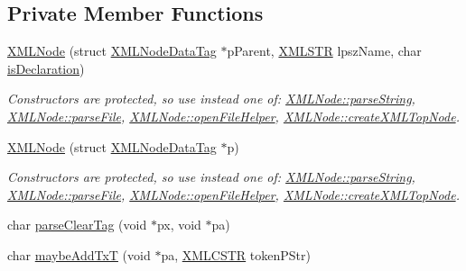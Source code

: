 \subsection*{Private Member Functions}
\begin{DoxyCompactItemize}
\item 
\hyperlink{structXMLNode_aa4a98957921a25716fd2936642d47967}{X\-M\-L\-Node} (struct \hyperlink{structXMLNode_1_1XMLNodeDataTag}{X\-M\-L\-Node\-Data\-Tag} $\ast$p\-Parent, \hyperlink{xmlParser_8h_a849d96105aa0c8f64b5c10d9151a3cdc}{X\-M\-L\-S\-T\-R} lpsz\-Name, char \hyperlink{group__navigate_ga71df27d54a2dc09b0a456406a7e8c6d3}{is\-Declaration})
\begin{DoxyCompactList}\small\item\em Constructors are protected, so use instead one of\-: \hyperlink{group__conversions_ga72125a4ccfae9b39bafab768346bbc7e}{X\-M\-L\-Node\-::parse\-String}, \hyperlink{group__conversions_gae984d7ebce97fad429b2b786439815fb}{X\-M\-L\-Node\-::parse\-File}, \hyperlink{group__conversions_ga46f99cf406604471e15d4378f74ecc63}{X\-M\-L\-Node\-::open\-File\-Helper}, \hyperlink{group__creation_ga1e2d0403450db891eedc76b6bfdba452}{X\-M\-L\-Node\-::create\-X\-M\-L\-Top\-Node}. \end{DoxyCompactList}\item 
\hyperlink{structXMLNode_a459bf6af13ca13472db5991050abd9dc}{X\-M\-L\-Node} (struct \hyperlink{structXMLNode_1_1XMLNodeDataTag}{X\-M\-L\-Node\-Data\-Tag} $\ast$p)
\begin{DoxyCompactList}\small\item\em Constructors are protected, so use instead one of\-: \hyperlink{group__conversions_ga72125a4ccfae9b39bafab768346bbc7e}{X\-M\-L\-Node\-::parse\-String}, \hyperlink{group__conversions_gae984d7ebce97fad429b2b786439815fb}{X\-M\-L\-Node\-::parse\-File}, \hyperlink{group__conversions_ga46f99cf406604471e15d4378f74ecc63}{X\-M\-L\-Node\-::open\-File\-Helper}, \hyperlink{group__creation_ga1e2d0403450db891eedc76b6bfdba452}{X\-M\-L\-Node\-::create\-X\-M\-L\-Top\-Node}. \end{DoxyCompactList}\item 
char \hyperlink{structXMLNode_a9ab5c0e463d037ebb9aa45c67f7cdc15}{parse\-Clear\-Tag} (void $\ast$px, void $\ast$pa)
\item 
char \hyperlink{structXMLNode_a271745140fedc83bef816bea25d7c84e}{maybe\-Add\-Tx\-T} (void $\ast$pa, \hyperlink{xmlParser_8h_acdb0d6fd8dd596384b438d86cfb2b182}{X\-M\-L\-C\-S\-T\-R} token\-P\-Str)
\item 

\end{DoxyCompactItemize}
